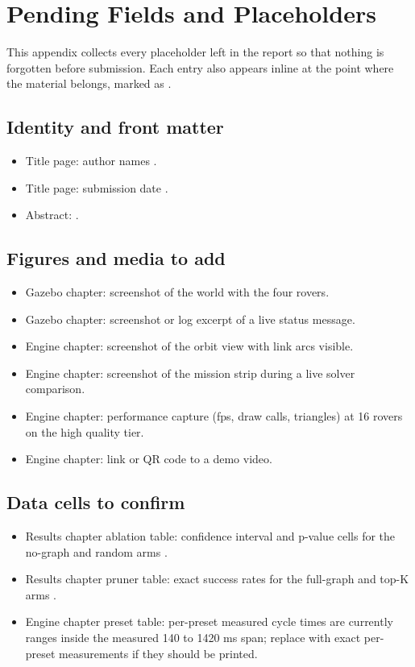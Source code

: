 \section{Pending Fields and Placeholders}
\label{app:pending}

This appendix collects every placeholder left in the report so that nothing
is forgotten before submission. Each entry also appears inline at the point
where the material belongs, marked as .

\subsection*{Identity and front matter}
\begin{itemize}
  \item Title page: author names .
  \item Title page: submission date .
  \item Abstract: .
\end{itemize}

\subsection*{Figures and media to add}
\begin{itemize}
  \item Gazebo chapter: screenshot of the world with the four rovers.
  \item Gazebo chapter: screenshot or log excerpt of a live status message.
  \item Engine chapter: screenshot of the orbit view with link arcs visible.
  \item Engine chapter: screenshot of the mission strip during a live solver
        comparison.
  \item Engine chapter: performance capture (fps, draw calls, triangles) at
        16 rovers on the high quality tier.
  \item Engine chapter: link or QR code to a demo video.
\end{itemize}

\subsection*{Data cells to confirm}
\begin{itemize}
  \item Results chapter ablation table: confidence interval and p-value
        cells for the no-graph and random arms .
  \item Results chapter pruner table: exact success rates for the
        full-graph and top-K arms .
  \item Engine chapter preset table: per-preset measured cycle times are
        currently ranges inside the measured 140 to 1420 ms span; replace
        with exact per-preset measurements if they should be printed.
\end{itemize}

